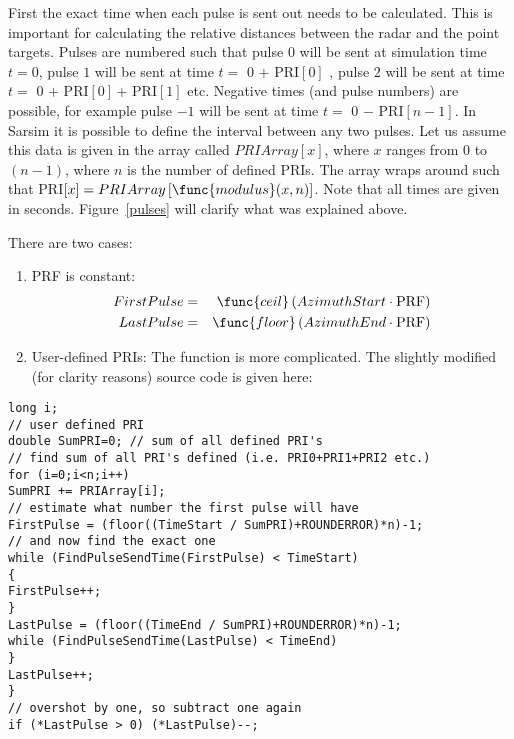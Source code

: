 First the exact time when each pulse is sent out needs to be calculated.
This is important for calculating the relative distances between the radar
and the point targets. Pulses are numbered such that pulse $0$ will be sent
at simulation time $t=0$, pulse $1$ will be sent at time $t=$ 0 $+$ PRI$[0]$%
, pulse $2$ will be sent at time $t=$ 0 $+$ PRI$[0]\,$+ PRI$[1]$ etc.
Negative times (and pulse numbers) are possible, for example pulse $-1$ will
be sent at time $t=$ 0 $-$ PRI$\left[ n-1\right] $. In Sarsim it is possible
to define the interval between any two pulses. Let us assume this data is
given in the array called $PRIArray[x]$, where $x$ ranges from $0$ to $%
\left( n-1\right) $, where $n$ is the number of defined PRIs. The array
wraps around such that PRI$[x]=PRIArray\left[ \func{modulus}(x,n)\right] $.
Note that all times are given in seconds. Figure~\ref{pulses} will clarify
what was explained above.


\pagebreak%

There are two cases:

\begin{enumerate}
\item  PRF is constant: 
\begin{eqnarray}
FirstPulse &=&\func{ceil}\left( AzimuthStart\cdot \text{PRF}\right)  \\
LastPulse &=&\func{floor}\left( AzimuthEnd\cdot \text{PRF}\right) 
\end{eqnarray}

\item  User-defined PRIs: The function is more complicated. The slightly
modified (for clarity reasons) source code is given here:
\end{enumerate}

\tiny
%
\begin{verbatim}
long i;
// user defined PRI
double SumPRI=0; // sum of all defined PRI's
// find sum of all PRI's defined (i.e. PRI0+PRI1+PRI2 etc.)
for (i=0;i<n;i++)
SumPRI += PRIArray[i];
// estimate what number the first pulse will have
FirstPulse = (floor((TimeStart / SumPRI)+ROUNDERROR)*n)-1;
// and now find the exact one
while (FindPulseSendTime(FirstPulse) < TimeStart)
{
FirstPulse++;
}
LastPulse = (floor((TimeEnd / SumPRI)+ROUNDERROR)*n)-1;
while (FindPulseSendTime(LastPulse) < TimeEnd)
}
LastPulse++;
}
// overshot by one, so subtract one again
if (*LastPulse > 0) (*LastPulse)--;
\end{verbatim}

